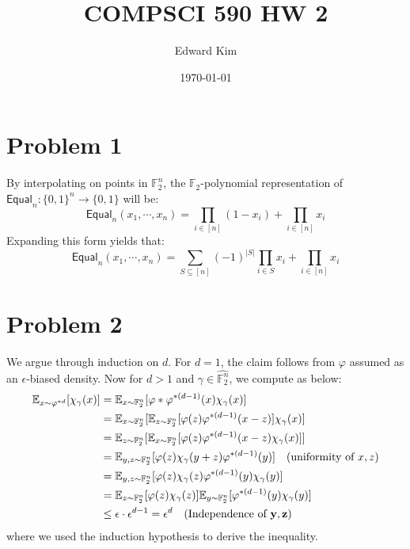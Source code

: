 \documentclass[12pt]{article}%
\newcommand{\F}{\mathbb{F}}
\newcommand{\Fn}{\mathbb{F}_2^n}
\newcommand{\Exp}[1]{\mathbb{E}_{#1}}
\renewcommand{\phi}{\varphi}
\begin{document}
\title{COMPSCI 590 HW 2}
\author{Edward Kim}
\date{\today}
\maketitle

\section*{Problem 1}
By interpolating on points in $\F_2^n$, the $\F_2$-polynomial representation of $\mathsf{Equal}_n: \{0,1\}^n \rightarrow \{0,1\}$ will be:
%
\[ \mathsf{Equal}_n(x_1,\cdots, x_n) = \prod_{i \in [n]} (1-x_i) + \prod_{i \in [n]} x_i\]
%
Expanding this form yields that:
%
\[ \mathsf{Equal}_n(x_1,\cdots, x_n) = \sum_{S \subseteq [n]} (-1)^{|S|}\prod_{i \in S} x_i  + \prod_{i \in [n]} x_i \]

\section*{Problem 2}
We argue through induction on $d$. For $d = 1$, the claim follows from $\phi$ assumed as an $\epsilon$-biased density. Now for $d > 1$ and $\gamma \in \widehat{\F_{2}^n}$, we compute as below:
\begin{align*}
  \Exp{x \sim \phi^{*d}}[\chi_{\gamma}(x)] & =   \Exp{x \sim \F_2^n}[\phi * \phi^{*(d-1)}(x)\chi_{\gamma}(x)] \\
  & = \Exp{x \sim \F_2^n}[\Exp{z \sim \Fn}[\phi(z)\phi^{*(d-1)}(x-z)]\chi_\gamma(x)] \\
  & = \Exp{z \sim \F_2^n}[\Exp{x \sim \Fn}[\phi(z)\phi^{*(d-1)}(x-z)\chi_\gamma(x)]] \\
  & = \Exp{y,z \sim \Fn} [\phi(z)\chi_\gamma(y+z)\phi^{*(d-1)}(y)] \quad \text{(uniformity of $x,z$)} \\
  & = \Exp{y,z \sim \Fn} [\phi(z)\chi_\gamma(z)\phi^{*(d-1)}(y)\chi_\gamma(y)] \\
  & = \Exp{z \sim \Fn} [\phi(z)\chi_\gamma(z)]\Exp{y \sim \Fn} [\phi^{*(d-1)}(y)\chi_\gamma(y)] \\
  & \leq \epsilon \cdot \epsilon^{d-1} = \epsilon^d \quad \text{(Independence of ${\bf y}, {\bf z}$)}
\end{align*}
where we used the induction hypothesis to derive the inequality.
\end{document}
